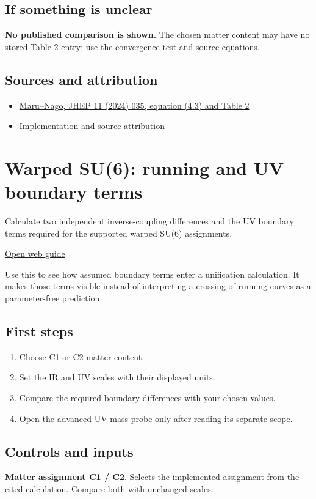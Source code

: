 \documentclass[11pt,a4paper]{article}
\begin{document}
\subsection*{If something is unclear}
\textbf{No published comparison is shown.} The chosen matter content may have no stored Table 2 entry; use the convergence test and source equations.

\subsection*{Sources and attribution}
\begin{itemize}
\item \href{https://doi.org/10.1007/JHEP11(2024)035}{Maru--Nago, JHEP 11 (2024) 035, equation (4.3) and Table 2}
\item \href{https://github.com/karlesmarin/ghu-lab/blob/main/src/modules/su6_maru_nago.mjs}{Implementation and source attribution}
\end{itemize}
\section{Warped SU(6): running and UV boundary terms}
Calculate two independent inverse-coupling differences and the UV boundary terms required for the supported warped SU(6) assignments.

\href{https://karlesmarin.github.io/ghu-explorer/guide/rsrunning/index.html}{Open web guide}

Use this to see how assumed boundary terms enter a unification calculation. It makes those terms visible instead of interpreting a crossing of running curves as a parameter-free prediction.
\subsection*{First steps}
\begin{enumerate}
\item Choose C1 or C2 matter content.
\item Set the IR and UV scales with their displayed units.
\item Compare the required boundary differences with your chosen values.
\item Open the advanced UV-mass probe only after reading its separate scope.
\end{enumerate}
\subsection*{Controls and inputs}
\textbf{Matter assignment C1 / C2}. Selects the implemented assignment from the cited calculation. Compare both with unchanged scales.
\end{document}
